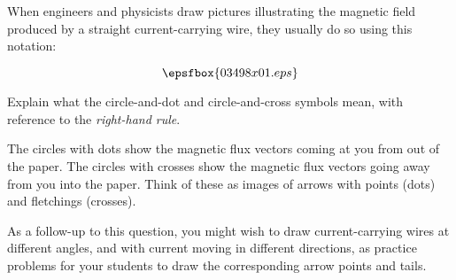 

When engineers and physicists draw pictures illustrating the magnetic field produced by a straight current-carrying wire, they usually do so using this notation:

$$\epsfbox{03498x01.eps}$$

Explain what the circle-and-dot and circle-and-cross symbols mean, with reference to the {\it right-hand rule}.







The circles with dots show the magnetic flux vectors coming at you from out of the paper.  The circles with crosses show the magnetic flux vectors going away from you into the paper.  Think of these as images of arrows with points (dots) and fletchings (crosses).







As a follow-up to this question, you might wish to draw current-carrying wires at different angles, and with current moving in different directions, as practice problems for your students to draw the corresponding arrow points and tails.




